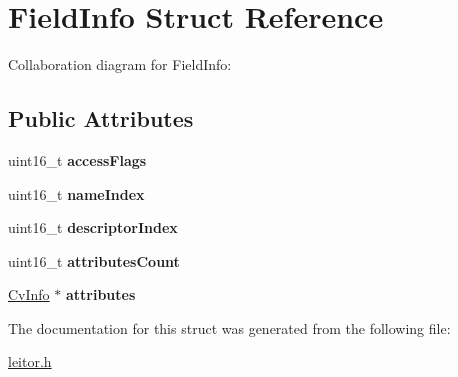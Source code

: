\hypertarget{structFieldInfo}{}\section{Field\+Info Struct Reference}
\label{structFieldInfo}


Collaboration diagram for Field\+Info\+:
\subsection*{Public Attributes}
\begin{DoxyCompactItemize}
\item 
\mbox{\label{structFieldInfo_a5fd94bd00a430098ff830c231d3f7a53}} 
uint16\+\_\+t {\bfseries access\+Flags}
\item 
\mbox{\label{structFieldInfo_a88ea5c29063df8933d5277e846924b1e}} 
uint16\+\_\+t {\bfseries name\+Index}
\item 
\mbox{\label{structFieldInfo_ab6cc30d06db3569171dd6fdcba7add29}} 
uint16\+\_\+t {\bfseries descriptor\+Index}
\item 
\mbox{\label{structFieldInfo_ad8eae2b3a0fccae8700ca53263983c6e}} 
uint16\+\_\+t {\bfseries attributes\+Count}
\item 
\mbox{\label{structFieldInfo_a44bc588a62523995db41f7186d6d4253}} 
\hyperlink{structCvInfo}{Cv\+Info} $\ast$ {\bfseries attributes}
\end{DoxyCompactItemize}


The documentation for this struct was generated from the following file\+:\begin{DoxyCompactItemize}
\item 
\hyperlink{leitor_8h}{leitor.\+h}\end{DoxyCompactItemize}
